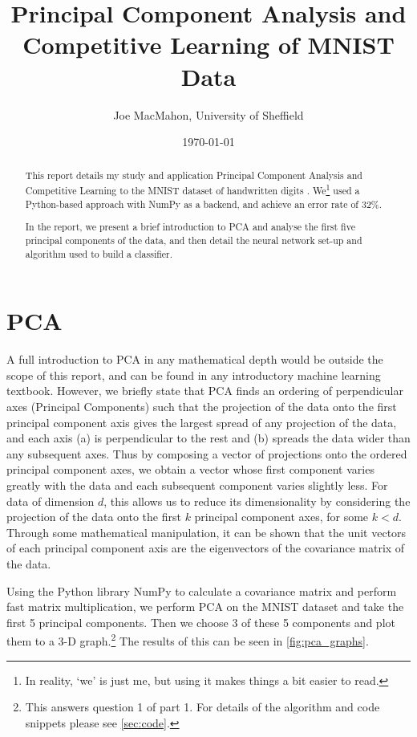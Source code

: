 \documentclass[a4paper, 11pt, twocolumn, final]{article} %
\title{Principal Component Analysis and Competitive Learning of MNIST Data}
\author{Joe MacMahon, University of Sheffield}
\date{\today}
\begin{document}
\maketitle

\begin{abstract}

This report details my study and application Principal Component Analysis and
Competitive Learning to the MNIST dataset of handwritten digits \cite{mnist}.
We\footnote{In reality, `we' is just me, but using it makes things a bit easier
to read.} used a Python-based approach with NumPy \cite{numpy} as a backend, and achieve an
error rate of 32\%.

In the report, we present a brief introduction to PCA and analyse the first five
principal components of the data, and then detail the neural network set-up and
algorithm used to build a classifier.

\end{abstract}

\section{PCA} A full introduction to PCA in any mathematical depth would be
outside the scope of this report, and can be found in any introductory machine
learning textbook.  However, we briefly state that PCA finds an ordering of
perpendicular axes (Principal Components) such that the projection of the data
onto the first principal component axis gives the largest spread of any
projection of the data, and each axis (a) is perpendicular to the rest and (b)
spreads the data wider than any subsequent axes.  Thus by composing a vector of
projections onto the ordered principal component axes, we obtain a vector whose
first component varies greatly with the data and each subsequent component
varies slightly less. For data of dimension $d$, this allows us to reduce its
dimensionality by considering the projection of the data onto the first $k$
principal component axes, for some $k < d$.  Through some mathematical
manipulation, it can be shown that the unit vectors of each principal component
axis are the eigenvectors of the covariance matrix of the data.

Using the Python library NumPy to calculate a covariance matrix and perform fast
matrix multiplication, we perform PCA on the MNIST dataset and take the first 5
principal components. Then we choose 3 of these 5 components and plot them to a
3-D graph.\footnote{This answers question 1 of part 1.  For details of the
algorithm and code snippets please see \autoref{sec:code}.} The results of this
can be seen in \autoref{fig:pca_graphs}.
\end{document}

